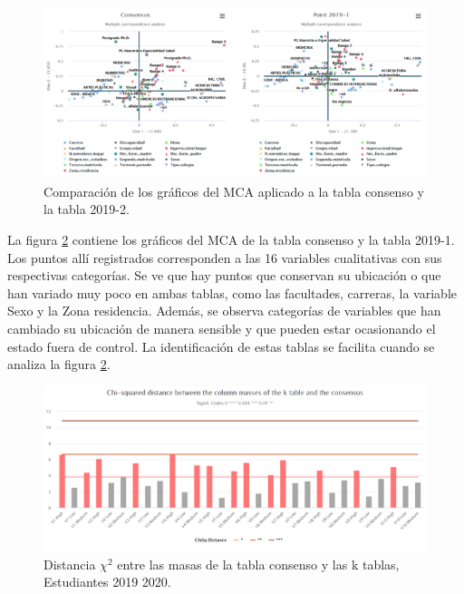 \documentclass[water,article,submit,moreauthors,pdftex]{mdpi}
\begin{document}
\begin{figure}[!ht]



\begin{center}\includegraphics[width=0.6\linewidth,]{conspointedu} \end{center}

\caption{Comparación de los gráficos del MCA aplicado a la tabla consenso y la tabla 2019-2.}

\label{fig:conspointedu}
\end{figure}

La figura \ref{fig:conspointedu} contiene los gráficos del MCA de la
tabla consenso y la tabla 2019-1. Los puntos allí registrados
corresponden a las 16 variables cualitativas con sus respectivas
categorías. Se ve que hay puntos que conservan su ubicación o que han
variado muy poco en ambas tablas, como las facultades, carreras, la
variable Sexo y la Zona residencia. Además, se observa categorías de
variables que han cambiado su ubicación de manera sensible y que pueden
estar ocasionando el estado fuera de control. La identificación de estas
tablas se facilita cuando se analiza la figura \ref{fig:conspointedu}.

\begin{figure}[!ht]



\begin{center}\includegraphics[width=0.6\linewidth,]{chibar} \end{center}

\caption{Distancia $\chi^2$ entre las masas de la tabla consenso y las k tablas, Estudiantes 2019 2020.}

\label{fig:conspointedu}
\end{figure}
\end{document}
